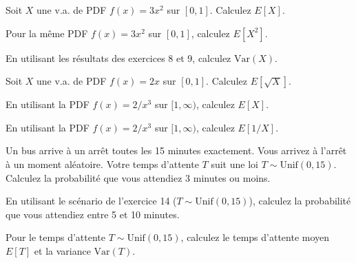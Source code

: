 
\begin{exercicebox}
Soit $X$ une v.a. de PDF $f(x) = 3x^2$ sur $[0, 1]$. Calculez $E[X]$.
\end{exercicebox}

\begin{exercicebox}
Pour la même PDF $f(x) = 3x^2$ sur $[0, 1]$, calculez $E[X^2]$.
\end{exercicebox}

\begin{exercicebox}
En utilisant les résultats des exercices 8 et 9, calculez $\text{Var}(X)$.
\end{exercicebox}

\begin{exercicebox}
Soit $X$ une v.a. de PDF $f(x) = 2x$ sur $[0, 1]$. Calculez $E[\sqrt{X}]$.
\end{exercicebox}

\begin{exercicebox}
En utilisant la PDF $f(x) = 2/x^3$ sur $[1, \infty)$, calculez $E[X]$.
\end{exercicebox}

\begin{exercicebox}
En utilisant la PDF $f(x) = 2/x^3$ sur $[1, \infty)$, calculez $E[1/X]$.
\end{exercicebox}


\begin{exercicebox}
Un bus arrive à un arrêt toutes les 15 minutes exactement. Vous arrivez à l'arrêt à un moment aléatoire. Votre temps d'attente $T$ suit une loi $T \sim \text{Unif}(0, 15)$. Calculez la probabilité que vous attendiez 3 minutes ou moins.
\end{exercicebox}

\begin{exercicebox}
En utilisant le scénario de l'exercice 14 ($T \sim \text{Unif}(0, 15)$), calculez la probabilité que vous attendiez entre 5 et 10 minutes.
\end{exercicebox}

\begin{exercicebox}
Pour le temps d'attente $T \sim \text{Unif}(0, 15)$, calculez le temps d'attente moyen $E[T]$ et la variance $\text{Var}(T)$.
\end{exercicebox}

